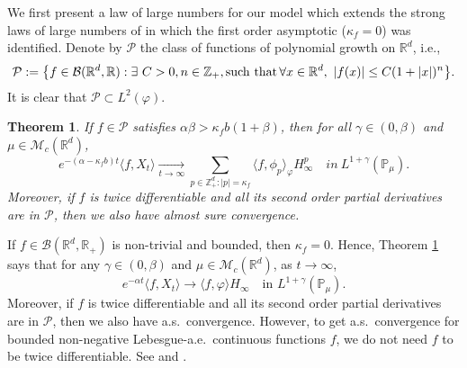 \documentclass[12pt,a4paper]{amsart}
\theoremstyle{plain}
\newtheorem{thm}{Theorem}[section]
\theoremstyle{definition}
\newtheorem{rem}[thm]{Remark}
\numberwithin{equation}{section}
\begin{document}
We first present a law of large numbers for our model which extends the strong laws of large numbers of \cite{ChenRenYang2019Skeleton, EckhoffKyprianouWinkel2015Spines} in which the first order asymptotic ($\kappa_f=0$) was identified.
Denote by $\mathcal P$ the class of functions of polynomial growth on $\mathbb R^d$, i.e.,
\begin{equation}
  \label{eq: polynomial growth function}
  \mathcal{P}
  :=\big \{f\in \mathcal B(\mathbb R^d, \mathbb R):\exists~ C>0, n \in \mathbb Z_+, {\rm such  \, \, that \, } \forall x\in \mathbb R^d,~ |f(x)|\leq C(1+|x|)^n\big\}.
\end{equation}
It is clear that $\mathcal{P} \subset L^2(\varphi)$.
\begin{thm}
  \label{thm: law of large number}
  If $f \in \mathcal{P}$ satisfies $\alpha\beta>\kappa_fb(1+\beta)$, then for all $\gamma\in (0, \beta)$ and  $\mu\in \mathcal M_c(\mathbb R^d)$,
  \[
    e^{-(\alpha-\kappa_fb)t}\langle f, X_t\rangle
    \xrightarrow[t\to \infty]{}\sum_{p\in \mathbb Z_+^d:|p|=\kappa_f}\langle f, \phi_p\rangle_{\varphi} H_{\infty}^p
    \quad in~ L^{1+\gamma}(\mathbb{P}_{\mu}).
  \]
  Moreover, if $f$ is twice differentiable and all its second order partial derivatives are in $\mathcal{P}$, then we also have almost sure convergence.
\end{thm}
If $f\in \mathcal B(\mathbb R^d, \mathbb R_+)$ is non-trivial and  bounded, then $\kappa_f=0$.
Hence, Theorem \ref{thm: law of large number} says that for any $\gamma\in (0, \beta)$ and  $\mu\in \mathcal M_c(\mathbb R^d)$, as $t\rightarrow \infty$,
\[
  e^{-\alpha t}\langle f, X_t\rangle
  \rightarrow \langle f, \varphi\rangle H_{\infty}
  \quad \mbox{in } L^{1+\gamma}(\mathbb{P}_{\mu}).
\]
Moreover, if $f$ is twice differentiable and all its second order partial derivatives are in $\mathcal{P}$, then we also have a.\/s.\ convergence.
However, to get  a.\/s.\ convergence for bounded non-negative 
Lebesgue-a.\/e.\/\ continuous functions $f$, we do not need $f$ to be twice differentiable. See \cite[Theorem 2.13 \& Example 8.1]{ChenRenYang2019Skeleton} and \cite[Theorem 1.2 \& Example 4.1]{EckhoffKyprianouWinkel2015Spines}.
\end{document}
